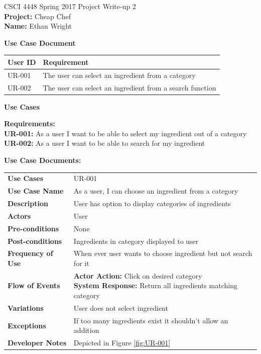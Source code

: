 \documentclass[12pt]{article}
\begin{document}
CSCI 4448 Spring 2017 \hfill Project Write-up 2\\
\textbf{Project: } Cheap Chef \\
\textbf{Name: } Ethan Wright \\


\hrulefill
\begin{center}
  \textbf{Use Case Document}
  \begin{tabular}{l  l}
    \textbf{User ID} & \textbf{Requirement} \\ \hline \rowcolor[gray]{.95}
    UR-001 & The user can select an ingredient from a category \\
    UR-002 & The user can select an ingredient from a search function \\ 
  \end{tabular}
\end{center}
\newpage
\begin{center}
  \textbf{Use Cases}
\end{center}
\textbf{Requirements: } \\
\textbf{UR-001: } As a user I want to be able to select my ingredient out of a category \\
\textbf{UR-002: } As a user I want to be able to search for my ingredient \\ 
\vspace{1cm}

\textbf{Use Case Documents:} \\
  \begin{tabular}{ l | l }
    \hline
    \textbf{Use Cases} & UR-001 \\ \rowcolor[gray]{.95}
    \textbf{Use Case Name} & As a user, I can choose an ingredient from a category \\ 
    \textbf{Description} & User has option to display categories of ingredients \\ \rowcolor[gray]{.95}
    \textbf{Actors} & User \\
    \textbf{Pre-conditions} & None \\ \rowcolor[gray]{.95}
    \textbf{Post-conditions} & Ingredients in category displayed to user \\ 
    \textbf{Frequency of Use} & When ever user wants to choose ingredient but not search for it \\ \rowcolor[gray]{.95}
    \textbf{Flow of Events} & \pbox{20cm}{\textbf{Actor Action: } Click on desired category\\ \textbf{System Response:} Return
    all ingredients matching category} \\ 
    \textbf{Variations} & User does not select ingredient \\  \rowcolor[gray]{.95}
    \textbf{Exceptions} & If too many ingredients exist it shouldn't allow an addition \\
    \textbf{Developer Notes} & Depicted in Figure \ref{fig:UR-001} \\ \hline
  \end{tabular}
\end{document}
